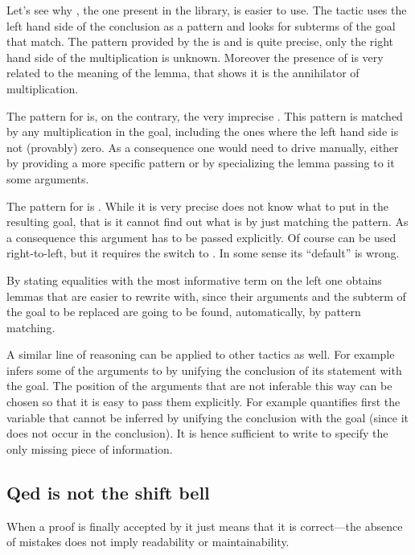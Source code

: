 Let's see why , the one present in the library, is easier to use.
The  tactic uses the left hand side of the conclusion as
a pattern and looks for subterms of the goal that match.
The pattern
provided by the  is  and is quite precise, only the
right hand side of the multiplication is unknown. Moreover the presence of
 is very related to the meaning of the lemma, that shows it is
the annihilator of multiplication.

The pattern for
 is, on the contrary, the very imprecise \C{(\_ * \_)}.
This pattern is matched by any multiplication in the goal, including
the ones where the left hand side is not (provably) zero. As a consequence
one would need to drive  manually, either by providing
a more specific pattern or by specializing the lemma passing to it
some arguments.

The pattern for  is . While it is very precise
 does not know what to put in the resulting goal, that is
it cannot find out what  is by just matching the pattern.
As a consequence this argument has to be passed explicitly.
Of course  can be used right-to-left, but it requires the
\C{$~$-}
switch to . In some sense its ``default'' is wrong.

By stating equalities with the most informative term on the left one
obtains lemmas that are easier to rewrite with, since their
arguments and the subterm of the goal to be replaced are going to be
found, automatically, by pattern matching.

A similar line of reasoning can be applied to other tactics as well. For
example  infers some of the arguments to  by unifying the
conclusion of its statement with the goal. The position of the arguments that
are not inferable this way can be chosen so that it is easy to pass them
explicitly.  For example  quantifies first the variable that cannot be inferred by unifying the
conclusion with the goal (since it does not occur in the conclusion).
It is hence sufficient to write  to specify the only
missing piece of information.

\subsection{Qed is not the shift bell}

When a proof is finally accepted by \Coq{} it just means that it is
correct---the absence of mistakes does not imply readability or maintainability.

